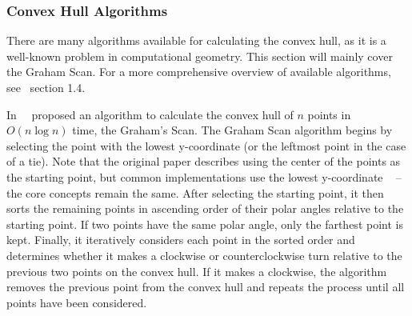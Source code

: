 \subsubsection{Convex Hull Algorithms}
There are many algorithms available for calculating the convex hull, as it is a well-known problem in computational geometry.
This section will mainly cover the Graham Scan.
For a more comprehensive overview of available algorithms, see~\cite{de_berg_computational_2008} section 1.4.

In~\citeyear{graham_efficient_1972}~\cite{graham_efficient_1972} proposed an algorithm to calculate
the convex hull of $n$ points in $O(n \log n)$ time, the Graham's Scan.
The Graham Scan algorithm begins by selecting the point with the lowest y-coordinate (or the leftmost point in the case of a tie).
Note that the original paper describes using the center of the points as the starting point,
but common implementations use the lowest y-coordinate
~\multiplefootnoteseparator{} --
the core concepts remain the same.
After selecting the starting point, it then sorts the remaining points in ascending order
of their polar angles relative to the starting point.
If two points have the same polar angle, only the farthest point is kept.
Finally, it iteratively considers each point in the sorted order and determines whether it
makes a clockwise or counterclockwise turn relative to the previous two points on the convex hull.
If it makes a clockwise, the algorithm removes the previous point from the convex hull
and repeats the process until all points have been considered.


